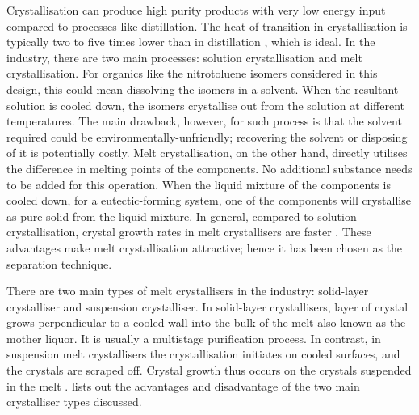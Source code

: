 Crystallisation can produce high purity products with very low energy input compared to processes like distillation. The heat of transition in crystallisation is typically two to five times lower than in distillation \cite{melt}, which is ideal. In the industry, there are two main processes: solution crystallisation and melt crystallisation. For organics like the nitrotoluene isomers considered in this design, this could mean dissolving the isomers in a solvent. When the resultant solution is cooled down, the isomers crystallise out from the solution at different temperatures. The main drawback, however, for such process is that the solvent required could be environmentally-unfriendly; recovering the solvent or disposing of it is potentially costly. Melt crystallisation, on the other hand, directly utilises the difference in melting points of the components. No additional substance needs to be added for this operation. When the liquid mixture of the components is cooled down, for a eutectic-forming system, one of the components will crystallise as pure solid from the liquid mixture. In general, compared to solution crystallisation, crystal growth rates in melt crystallisers are faster \cite{myerson_handbook_2019}. These advantages make melt crystallisation attractive; hence it has been chosen as the separation technique. 


There are two main types of melt crystallisers in the industry: solid-layer crystalliser and suspension crystalliser. In solid-layer crystallisers, layer of crystal grows perpendicular to a cooled wall into the bulk of the melt also known as the mother liquor. It is usually a multistage purification process. In contrast, in suspension melt crystallisers the crystallisation initiates on cooled surfaces, and the crystals are scraped off. Crystal growth thus occurs on the crystals suspended in the melt \cite{myerson_handbook_2019}.  lists out the advantages and disadvantage of the two main crystalliser types discussed. 

